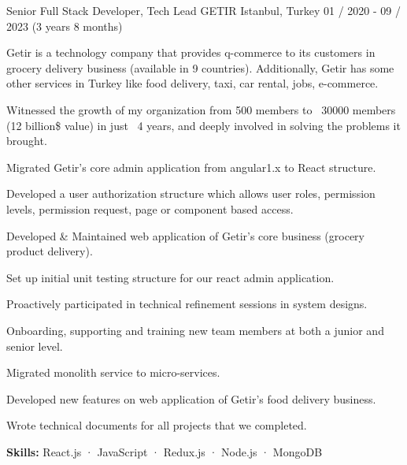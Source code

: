 \begin{cventries}
  \cventry
    {Senior Full Stack Developer, Tech Lead} %
    {GETIR} %
    {Istanbul, Turkey} %
    {01 / 2020 - 09 / 2023 (3 years 8 months)}
    {
      \begin{cvitems} %
        \item {Getir is a technology company that provides q-commerce to its customers in grocery delivery business (available in 9 countries). Additionally, Getir has some other services in Turkey like food delivery, taxi, car rental, jobs, e-commerce.}
        \item {Witnessed the growth of my organization from 500 members to ~30000 members (12 billion{\$} value) in just ~4 years, and deeply involved in solving the problems it brought.}
        \item {Migrated Getir's core admin application from angular1.x to React structure.}
        \item {Developed a user authorization structure which allows user roles, permission levels, permission request, page or component based access.}
        \item {Developed {\&} Maintained web application of Getir's core business (grocery product delivery).}
        \item {Set up initial unit testing structure for our react admin application.}
        \item {Proactively participated in technical refinement sessions in system designs.}
        \item {Onboarding, supporting and training new team members at both a junior and senior level.}
        \item {Migrated monolith service to micro-services.}
        \item {Developed new features on web application of Getir's food delivery business.}
        \item {Wrote technical documents for all projects that we completed.}
        \item {\textbf {Skills:} React.js · JavaScript · Redux.js · Node.js · MongoDB}
      \end{cvitems}
    }


\end{cventries}
